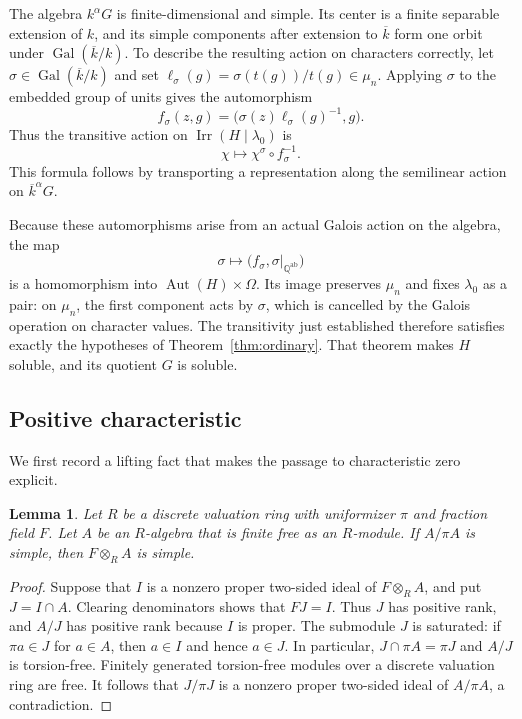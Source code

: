 \documentclass[11pt,a4paper]{amsart}
\DeclareMathOperator{\Irr}{Irr}
\DeclareMathOperator{\Aut}{Aut}
\DeclareMathOperator{\Gal}{Gal}
\newtheorem{lemma}[theorem]{Lemma}
\theoremstyle{remark}
\numberwithin{equation}{section}
\begin{document}
The algebra $k^\alpha G$ is finite-dimensional and simple.
Its center is a finite separable extension of $k$, and its
simple components after extension to $\overline k$ form one
orbit under $\Gal(\overline k/k)$. To describe the resulting
action on characters correctly, let
$\sigma\in\Gal(\overline k/k)$ and set
$\ell_\sigma(g)=\sigma(t(g))/t(g)\in\mu_n$.
Applying $\sigma$ to the embedded group of units gives the
automorphism
\[
 f_\sigma(z,g)
   =\bigl(\sigma(z)\ell_\sigma(g)^{-1},g\bigr).
\]
Thus the transitive action on $\Irr(H\mid\lambda_0)$ is
\[
 \chi\longmapsto\chi^\sigma\circ f_\sigma^{-1}.
\]
This formula follows by transporting a representation along the
semilinear action on $\overline k^\alpha G$.

Because these automorphisms arise from an actual Galois action
on the algebra, the map
\[
 \sigma\longmapsto
 \bigl(f_\sigma,\sigma|_{\mathbb Q^{\mathrm{ab}}}\bigr)
\]
is a homomorphism into $\Aut(H)\times\Omega$.
Its image preserves $\mu_n$ and fixes $\lambda_0$ as a pair:
on $\mu_n$, the first component acts by $\sigma$, which is
cancelled by the Galois operation on character values.
The transitivity just established therefore satisfies exactly
the hypotheses of Theorem~\ref{thm:ordinary}.
That theorem makes $H$ soluble, and its quotient $G$ is soluble.

\subsection{Positive characteristic}

We first record a lifting fact that makes the passage to
characteristic zero explicit.

\begin{lemma}\label{lemma:generic-simple}
Let $R$ be a discrete valuation ring with uniformizer $\pi$ and
fraction field $F$. Let $A$ be an $R$-algebra that is finite free
as an $R$-module. If $A/\pi A$ is simple, then $F\otimes_R A$ is
simple.
\end{lemma}

\begin{proof}
Suppose that $I$ is a nonzero proper two-sided ideal of
$F\otimes_R A$, and put $J=I\cap A$. Clearing denominators shows
that $FJ=I$. Thus $J$ has positive rank, and $A/J$ has positive
rank because $I$ is proper.
The submodule $J$ is saturated: if $\pi a\in J$ for $a\in A$,
then $a\in I$ and hence $a\in J$. In particular,
$J\cap\pi A=\pi J$ and $A/J$ is torsion-free.
Finitely generated torsion-free modules over a discrete valuation
ring are free. It follows that $J/\pi J$ is a nonzero proper
two-sided ideal of $A/\pi A$, a contradiction.
\end{proof}
\end{document}
